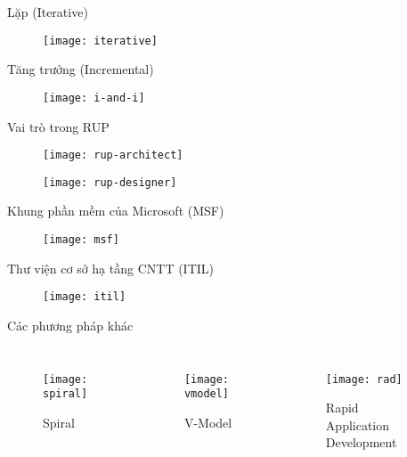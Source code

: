 \documentclass{beamer}
\begin{document}
\begin{frame}{Lặp (Iterative)}
    \begin{figure}
        \centering
        \texttt{[image: iterative]}
    \end{figure}
\end{frame}

\begin{frame}{Tăng trưởng (Incremental)}
    \begin{figure}
        \centering
        \texttt{[image: i-and-i]}
    \end{figure}
\end{frame}

\begin{frame}{Vai trò trong RUP}
    \begin{figure}
        \centering
        \texttt{[image: rup-architect]}
    \end{figure}
    \begin{figure}
        \centering
        \texttt{[image: rup-designer]}
    \end{figure}
\end{frame}

\begin{frame}{Khung phần mềm của Microsoft (MSF)}
    \begin{figure}
        \centering
        \texttt{[image: msf]}
    \end{figure}
\end{frame}

\begin{frame}{Thư viện cơ sở hạ tầng CNTT (ITIL)}
    \begin{figure}
        \centering
        \texttt{[image: itil]}
    \end{figure}
\end{frame}

\begin{frame}{Các phương pháp khác}
    \begin{columns}
        \begin{figure}
            \centering
            \texttt{[image: spiral]}
            \caption{Spiral}
        \end{figure}
        \begin{figure}
            \centering
            \texttt{[image: vmodel]}
            \caption{V-Model}
        \end{figure}
        \begin{figure}
            \centering
            \texttt{[image: rad]}
            \caption{Rapid Application Development}
        \end{figure}
    \end{columns}
\end{frame}
\end{document}
